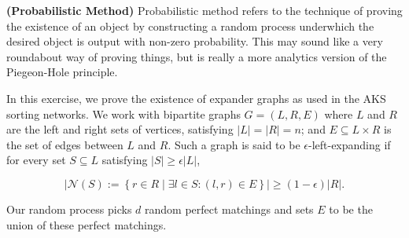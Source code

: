 \documentclass[solution,addpoints,12pt]{exam}
\newcommand{\curly}[1]{\left\{ #1 \right\}}
\newcommand{\card}[1]{\left\lvert #1 \right\rvert}
\begin{document}
\begin{questions}

\question[25] \textbf{(Probabilistic Method)}  Probabilistic method refers to the technique of proving the existence of an object by constructing a random process underwhich the desired object is output with non-zero probability.  This may sound like a very roundabout way of proving things, but is really a more analytics version of the Piegeon-Hole principle.

In this exercise, we prove the existence of expander graphs as used in the AKS sorting networks.  We work with bipartite graphs $G = (L, R, E)$ where $L$ and $R$ are the left and right sets of vertices, satisfying $\card{L} = \card{R} = n$; and $E \subseteq L \times R$ is the set of edges between $L$ and $R$.   Such a graph is said to be $\epsilon$-left-expanding if for every set $S \subseteq L$ satisfying $\card{S} \ge \epsilon \card{L}$,

\newcommand{\nbor}{\mathcal{N}}
\[ \card{\nbor(S) := \curly{ r \in R \mid \exists l \in S: (l, r) \in E }} \ge (1 - \epsilon) \card{R}. \]

Our random process picks $d$ random perfect matchings and sets $E$ to be the union of these perfect matchings.

\end{questions}
\end{document}

